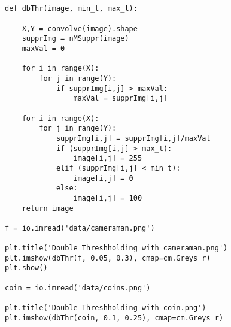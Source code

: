 \subsection{}
\begin{verbatim}
def dbThr(image, min_t, max_t):
    
    X,Y = convolve(image).shape
    supprImg = nMSuppr(image)
    maxVal = 0
    
    for i in range(X):
        for j in range(Y):
            if supprImg[i,j] > maxVal:
                maxVal = supprImg[i,j]
    
    for i in range(X):
        for j in range(Y):
            supprImg[i,j] = supprImg[i,j]/maxVal
            if (supprImg[i,j] > max_t):
                image[i,j] = 255
            elif (supprImg[i,j] < min_t):
                image[i,j] = 0
            else:
                image[i,j] = 100
    return image

f = io.imread('data/cameraman.png')

plt.title('Double Threshholding with cameraman.png')
plt.imshow(dbThr(f, 0.05, 0.3), cmap=cm.Greys_r)
plt.show()

coin = io.imread('data/coins.png')

plt.title('Double Threshholding with coin.png')
plt.imshow(dbThr(coin, 0.1, 0.25), cmap=cm.Greys_r)
\end{verbatim}